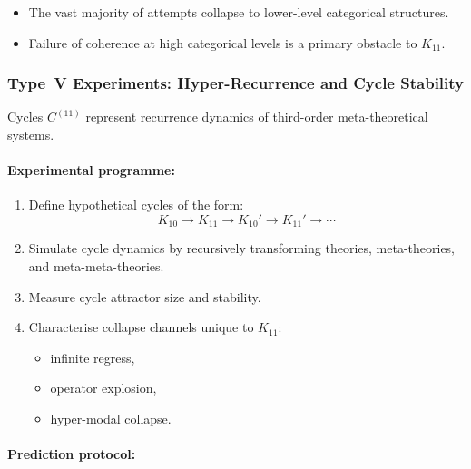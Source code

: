 \begin{itemize}
    \item The vast majority of attempts collapse to 
          lower-level categorical structures.
    \item Failure of coherence at high categorical levels is a 
          primary obstacle to $K_{11}$.
\end{itemize}



\subsubsection{Type~V Experiments: Hyper-Recurrence and Cycle Stability}

Cycles $C^{(11)}$ represent recurrence dynamics of third-order 
meta-theoretical systems.

\paragraph{Experimental programme:}

\begin{enumerate}
    \item Define hypothetical cycles of the form:
          \[
              K_{10}
                \longrightarrow
              K_{11}
                \longrightarrow
              K_{10}'
                \longrightarrow
              K_{11}'
                \longrightarrow \cdots
          \]
    \item Simulate cycle dynamics by recursively transforming 
          theories, meta-theories, and meta-meta-theories.
    \item Measure cycle attractor size and stability.
    \item Characterise collapse channels unique to $K_{11}$:
          \begin{itemize}
              \item infinite regress,
              \item operator explosion,
              \item hyper-modal collapse.
          \end{itemize}
\end{enumerate}

\paragraph{Prediction protocol:}

